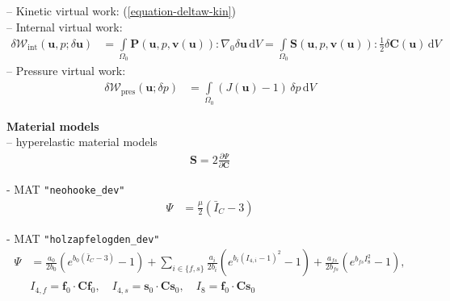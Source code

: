 \documentclass[a4paper,12pt]{report}
\newcommand{\Om}{\mathit{\Omega}}
\begin{document}
-- Kinetic virtual work: (\ref{equation-deltaw-kin})\\
-- Internal virtual work:
\begin{equation}
\label{equation-deltaw-int-inc}
\begin{aligned}
\delta \mathcal{W}_{\mathrm{int}}(\boldsymbol{u},p;\delta\boldsymbol{u}) &= \int\limits_{\Om_{0}} \boldsymbol{P}(\boldsymbol{u},p,\boldsymbol{v}(\boldsymbol{u})) : \nabla_{0} \delta\boldsymbol{u} \,\mathrm{d}V = \int\limits_{\Om_{0}} \boldsymbol{S}(\boldsymbol{u},p,\boldsymbol{v}(\boldsymbol{u})) : \frac{1}{2}\delta\boldsymbol{C}(\boldsymbol{u}) \,\mathrm{d}V
\end{aligned}
\end{equation}
-- Pressure virtual work:
\begin{equation}
\label{equation-deltaw-p}
\begin{aligned}
\delta \mathcal{W}_{\mathrm{pres}}(\boldsymbol{u};\delta p) &= \int\limits_{\Om_{0}} (J(\boldsymbol{u}) - 1) \,\delta p \,\mathrm{d}V 
\end{aligned}
\end{equation}


\textbf{Material models}\\
-- hyperelastic material models
\begin{equation}
\begin{aligned}
\boldsymbol{S} = 2\frac{\partial\mathit{\Psi}}{\partial \boldsymbol{C}}
\end{aligned}
\end{equation}

- MAT \verb."neohooke_dev".\\

\begin{equation}
\begin{aligned}
\mathit{\Psi} &= \frac{\mu}{2}\left(\bar{I}_C - 3\right)
\end{aligned}
\end{equation}


- MAT \verb."holzapfelogden_dev".\\
\begin{equation}
\begin{aligned}
\mathit{\Psi} &= \frac{a_0}{2b_0}\left(e^{b_0(\bar{I}_C - 3)} - 1\right) + \sum\limits_{i\in\{f,s\}}\frac{a_i}{2b_i}\left(e^{b_i(I_{4,i}-1)^2}-1\right) + \frac{a_{fs}}{2b_{fs}}\left(e^{b_{fs}I_{8}^2} - 1\right), \\ & I_{4,f} = \boldsymbol{f}_0 \cdot \boldsymbol{C}\boldsymbol{f}_0, \quad I_{4,s} = \boldsymbol{s}_0 \cdot \boldsymbol{C}\boldsymbol{s}_0, \quad I_8 = \boldsymbol{f}_0 \cdot \boldsymbol{C}\boldsymbol{s}_0
\end{aligned}
\end{equation}
\end{document}
